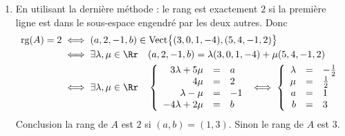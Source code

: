 {{\begin{enumerate}
\begin{itemize}
Attention : les dimensions des espaces vectoriels engendrés sont égales mais les espaces sont différents !
  \end{itemize}

  \item En utilisant la dernière méthode : le rang est exactement $2$ si la première ligne est dans le sous-espace engendré
par les deux autres.
Donc 
\begin{align*}
\textrm{rg}(A) = 2
 & \iff (a,2,-1,b) \in \textrm{Vect} \big\{ (3,0,1,-4), (5,4,-1,2) \big\} \\
 & \iff \exists \lambda,\mu \in \Rr \quad (a,2,-1,b) = \lambda (3,0,1,-4) + \mu(5,4,-1,2) \\
 & \iff \exists \lambda,\mu \in \Rr \quad 
\left\{
\begin{array}{rcl}
3\lambda+5\mu &=& a \\
4\mu &=& 2 \\
\lambda-\mu &=& -1 \\
-4\lambda+2\mu &=& b \\
\end{array}
\right. 
 \iff  \left\{
\begin{array}{rcl}
\lambda &=& -\frac12 \\
\mu &=& \frac12 \\
a &=& 1 \\
b &=& 3 \\
\end{array} 
\right.\\  
\end{align*}
Conclusion la rang de $A$ est $2$ si $(a,b)=(1,3)$. Sinon le rang de $A$ est $3$.
\end{enumerate}}
}